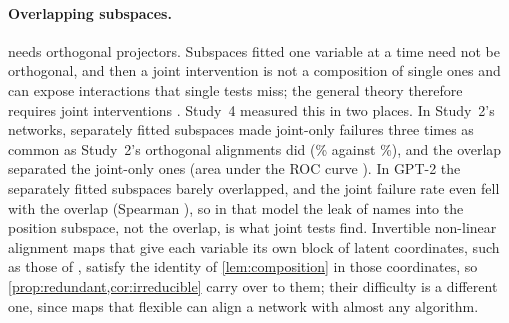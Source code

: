 \paragraph{Overlapping subspaces.}
 needs orthogonal projectors. Subspaces fitted one variable at a time need not be orthogonal,
and then a joint intervention is not a composition of single ones and can expose interactions that single tests miss;
the general theory therefore requires joint interventions \citep{geiger2025abstraction}. Study~4 measured this in two
places. In Study~2's networks, separately fitted subspaces made joint-only failures three times as common as
Study~2's orthogonal alignments did (\DShare\% against \DRefShare\%), and the overlap separated the joint-only ones
(area under the ROC curve \DAuroc). In GPT-2 the separately fitted subspaces barely overlapped, and the joint failure
rate even fell with the overlap (Spearman \SepSpearman), so in that model the leak of names into the position subspace,
not the overlap, is what joint tests find. Invertible non-linear alignment maps that give each variable its own block
of latent coordinates, such as those of \citet{sutter2025nonlinear}, satisfy the identity of \cref{lem:composition} in
those coordinates, so \cref{prop:redundant,cor:irreducible} carry over to them; their difficulty is a different one,
since maps that flexible can align a network with almost any algorithm.

